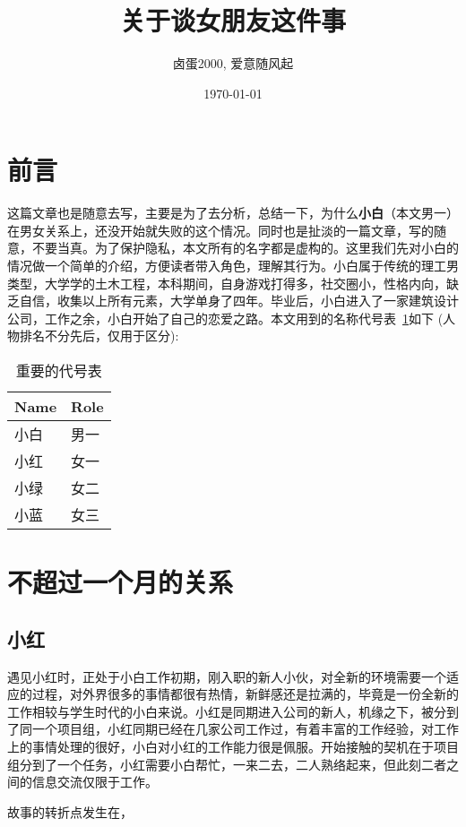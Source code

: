 \documentclass{article}
\title{\textbf{关于谈女朋友这件事}}
\author{卤蛋2000, 爱意随风起}
\date{\today}
\begin{document}
\maketitle

\section{前言}
这篇文章也是随意去写，主要是为了去分析，总结一下，为什么\textbf{小白}（本文男一）在男女关系上，还没开始就失败的这个情况。同时也是扯淡的一篇文章，写的随意，不要当真。为了保护隐私，本文所有的名字都是虚构的。这里我们先对小白的情况做一个简单的介绍，方便读者带入角色，理解其行为。小白属于传统的理工男类型，大学学的土木工程，本科期间，自身游戏打得多，社交圈小，性格内向，缺乏自信，收集以上所有元素，大学单身了四年。毕业后，小白进入了一家建筑设计公司，工作之余，小白开始了自己的恋爱之路。本文用到的名称代号表~\ref{name_replace}如下 (人物排名不分先后，仅用于区分):

\begin{table}[h]
    \caption{重要的代号表}
    \label{name_replace}
    \centering
\begin{tabular}{ll}
\toprule
Name & Role \\
\midrule
小白 & 男一 \\
小红 & 女一 \\
小绿 & 女二 \\
小蓝 & 女三 \\
\bottomrule
\end{tabular}

\end{table}

\section{不超过一个月的关系}
\subsection{小红}
遇见小红时，正处于小白工作初期，刚入职的新人小伙，对全新的环境需要一个适应的过程，对外界很多的事情都很有热情，新鲜感还是拉满的，毕竟是一份全新的工作相较与学生时代的小白来说。小红是同期进入公司的新人，机缘之下，被分到了同一个项目组，小红同期已经在几家公司工作过，有着丰富的工作经验，对工作上的事情处理的很好，小白对小红的工作能力很是佩服。开始接触的契机在于项目组分到了一个任务，小红需要小白帮忙，一来二去，二人熟络起来，但此刻二者之间的信息交流仅限于工作。

故事的转折点发生在，
\end{document}
